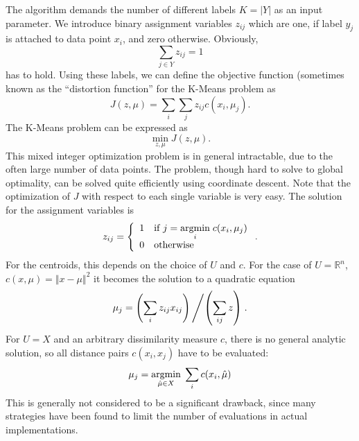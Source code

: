 The algorithm demands the number of different labels $K=|Y|$ as an input parameter.
We introduce binary assignment variables $z_{ij}$ which are one, if label $y_j$ is attached to data point $x_i$, and zero otherwise. 
Obviously, 
\[\sum_{j\in Y}z_{ij} = 1\]
has to hold.
Using these labels, we can define the objective function (sometimes known as the ``distortion function'' for the K-Means problem as
\begin{equation}
  \label{eq:5}
  J(z, \mu) = \sum_{i}\sum_{j}z_{ij}c(x_i, \mu_j).
\end{equation}
The K-Means problem can be expressed as
\begin{equation}
  \label{eq:3}
  \min\limits_{z, \mu}J(z, \mu).
\end{equation}
This mixed integer optimization problem is in general intractable, due to the often large number of data points.
The problem, though hard to solve to global optimality, can be solved quite efficiently using coordinate descent.
Note that the optimization of $J$ with respect to each single variable is very easy.
The solution for the assignment variables is
\begin{equation}
  \label{eq:4}
  z_{ij} = \left\{\begin{array}{ll}1&\text{if }j=\underset{i}{\operatorname{argmin}}\; c(x_i,\mu_j)\\0&\text{otherwise} \end{array}\right. .
\end{equation}
For the centroids, this depends on the choice of $U$ and $c$.
For the case of $U=\mathbb{R}^n$, $c(x,\mu) = \Vert x-\mu\Vert^2$ it becomes the solution to a quadratic equation
\begin{equation}
  \label{eq:6}
  \mu_j = \left(\sum_{i}z_{ij}x_{ij}\right)\left / \left(\sum_{ij}z\right)\right. .
\end{equation}
For $U=X$ and an arbitrary dissimilarity measure $c$, there is no general analytic solution, so all distance pairs $c(x_i, x_j)$ have to be evaluated:
\begin{equation}
  \label{eq:7}
  \mu_j = \underset{\hat{\mu}\in X}{\operatorname{argmin}}\; \sum_{i}c(x_i,\hat{\mu})
\end{equation}
This is generally not considered to be a significant drawback, since many strategies have been found to limit the number of evaluations in actual implementations.

